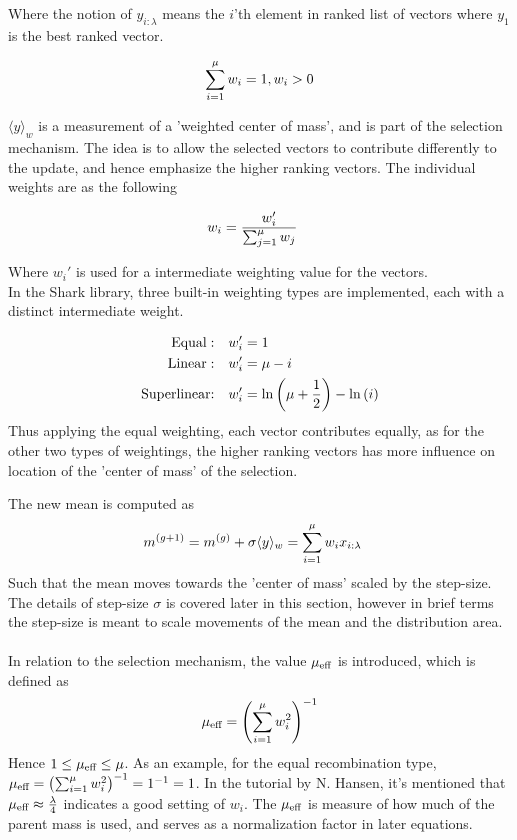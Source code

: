 Where the notion of $y_{i : \lambda}$ means the $i$'th element in ranked list of vectors
where $y_1$ is the best ranked vector.

\begin{align}
\sum^{\mu}_{i = 1} w_{i} = 1, w_{i} > 0
\end{align}

$\langle y \rangle_{w}$ is a measurement of a 'weighted center of mass',
and is part of the selection mechanism. The idea is to allow the selected vectors
to contribute differently to the update, and hence emphasize the higher 
ranking vectors. The individual weights are as the following

\begin{align}
w_i &= \frac{w_{i}'}{\sum^{\mu}_{j=1} w_j }
\end{align}

Where $w_i'$ is used for a intermediate weighting value for the vectors.\\
In the Shark library, three built-in weighting types are implemented, each with
a distinct intermediate weight.

\begin{align}
\text{Equal}: &\quad w_i' = 1 \label{eq:recomType}\\
\text{Linear}: &\quad  w_i' = \mu - i\\
\text{Superlinear:} &\quad w_i' = \ln \left( \mu + \frac{1}{2} \right)
- \ln \left( i \right)
\end{align}
Thus applying the equal weighting, each vector contributes equally, as for the other two types
of weightings, the 
higher ranking vectors has more influence on location of the 'center of mass' of 
the selection.

The new mean is computed as
\begin{align}
m^{(g+1)} &= m^{(g)} + \sigma \langle y \rangle_{w} = \sum^{\mu}_{i = 1} w_{i}x_{i:\lambda} \label{eq:movemean}
\end{align}
Such that the mean moves towards the 'center of mass' scaled by the step-size.
The details of step-size $\sigma$ is covered later in this section,
however in brief terms the step-size is meant to scale movements 
of the mean and the distribution area.\\
\\
In relation to the selection mechanism, the value $\mu_{\text{eff}}$ is introduced,
which is defined as
\begin{align}
\mu_{\text{eff}} = \left( \sum_{i=1}^{\mu} w_i^2 \right)^{-1}
\end{align}
Hence $1 \leq \mu_{\text{eff}} \leq \mu$. As an example, for the equal recombination
type, $\mu_{\text{eff}} = \left( \sum_{i=1}^{\mu} w_i^2 \right)^{-1} = 1^{-1} =1$.
In the tutorial by N. Hansen, it's mentioned that $\mu_{\text{eff}} \approx 
\frac{\lambda}{4}$ indicates a good setting of $w_i$. The $\mu_{\text{eff}}$ is 
measure of how much of the parent mass is used, and serves as a normalization 
factor in later equations.\\


